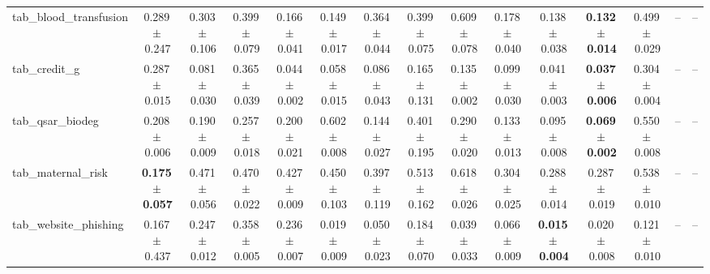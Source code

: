 \documentclass[8pt]{extarticle}
\begin{document}
\begin{longtable}{l*{14}{c}}
tab\_blood\_transfusion & 0.289\,$\pm$\,0.247 & 0.303\,$\pm$\,0.106 & 0.399\,$\pm$\,0.079 & 0.166\,$\pm$\,0.041 & 0.149\,$\pm$\,0.017 & 0.364\,$\pm$\,0.044 & 0.399\,$\pm$\,0.075 & 0.609\,$\pm$\,0.078 & 0.178\,$\pm$\,0.040 & 0.138\,$\pm$\,0.038 & \textbf{0.132\,$\pm$\,0.014} & 0.499\,$\pm$\,0.029 & -- & -- \\
tab\_credit\_g & 0.287\,$\pm$\,0.015 & 0.081\,$\pm$\,0.030 & 0.365\,$\pm$\,0.039 & 0.044\,$\pm$\,0.002 & 0.058\,$\pm$\,0.015 & 0.086\,$\pm$\,0.043 & 0.165\,$\pm$\,0.131 & 0.135\,$\pm$\,0.002 & 0.099\,$\pm$\,0.030 & 0.041\,$\pm$\,0.003 & \textbf{0.037\,$\pm$\,0.006} & 0.304\,$\pm$\,0.004 & -- & -- \\
tab\_qsar\_biodeg & 0.208\,$\pm$\,0.006 & 0.190\,$\pm$\,0.009 & 0.257\,$\pm$\,0.018 & 0.200\,$\pm$\,0.021 & 0.602\,$\pm$\,0.008 & 0.144\,$\pm$\,0.027 & 0.401\,$\pm$\,0.195 & 0.290\,$\pm$\,0.020 & 0.133\,$\pm$\,0.013 & 0.095\,$\pm$\,0.008 & \textbf{0.069\,$\pm$\,0.002} & 0.550\,$\pm$\,0.008 & -- & -- \\
tab\_maternal\_risk & \textbf{0.175\,$\pm$\,0.057} & 0.471\,$\pm$\,0.056 & 0.470\,$\pm$\,0.022 & 0.427\,$\pm$\,0.009 & 0.450\,$\pm$\,0.103 & 0.397\,$\pm$\,0.119 & 0.513\,$\pm$\,0.162 & 0.618\,$\pm$\,0.026 & 0.304\,$\pm$\,0.025 & 0.288\,$\pm$\,0.014 & 0.287\,$\pm$\,0.019 & 0.538\,$\pm$\,0.010 & -- & -- \\
tab\_website\_phishing & 0.167\,$\pm$\,0.437 & 0.247\,$\pm$\,0.012 & 0.358\,$\pm$\,0.005 & 0.236\,$\pm$\,0.007 & 0.019\,$\pm$\,0.009 & 0.050\,$\pm$\,0.023 & 0.184\,$\pm$\,0.070 & 0.039\,$\pm$\,0.033 & 0.066\,$\pm$\,0.009 & \textbf{0.015\,$\pm$\,0.004} & 0.020\,$\pm$\,0.008 & 0.121\,$\pm$\,0.010 & -- & -- \\
\end{longtable}
\end{document}
